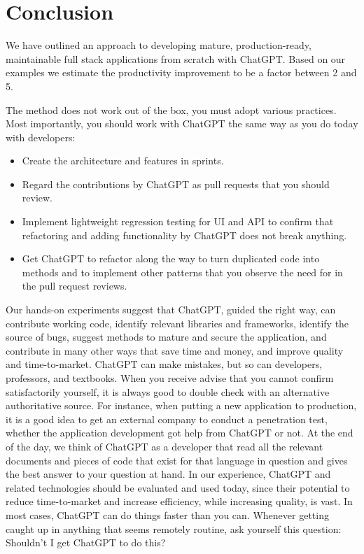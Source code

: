 \documentclass[runningheads]{llncs}
\begin{document}
\section{Conclusion}
We have outlined an approach to developing mature, production-ready, maintainable full stack applications from scratch with ChatGPT. Based on our examples we estimate the productivity improvement to be a factor between 2 and 5.

The method does not work out of the box, you must adopt various practices. Most importantly, you should work with ChatGPT the same way as you do today with developers:
\begin{itemize}
    \item Create the architecture and features in sprints.
    \item Regard the contributions by ChatGPT as pull requests that you should review.
    \item Implement lightweight regression testing for UI and API to confirm that refactoring and adding functionality by ChatGPT does not break anything.
    \item Get ChatGPT to refactor along the way to turn duplicated code into methods and to implement other patterns that you observe the need for in the pull request reviews.
\end{itemize}
Our hands-on experiments suggest that ChatGPT, guided the right way, can contribute working code, identify relevant libraries and frameworks, identify the source of bugs, suggest methods to mature and secure the application, and contribute in many other ways that save time and money, and improve quality and time-to-market.
ChatGPT can make mistakes, but so can developers, professors, and textbooks. When you receive advise that you cannot confirm satisfactorily yourself, it is always good to double check with an alternative authoritative source. For instance, when putting a new application to production, it is a good idea to get an external company to conduct a penetration test, whether the application development got help from ChatGPT or not.
At the end of the day, we think of ChatGPT as a developer that read all the relevant documents and pieces of code that exist for that language in question and gives the best answer to your question at hand. In our experience, ChatGPT and related technologies should be evaluated and used today, since their potential to reduce time-to-market and increase efficiency, while increasing quality, is vast.
In most cases, ChatGPT can do things faster than you can. Whenever getting caught up in anything that seems remotely routine, ask yourself this question: Shouldn't I get ChatGPT to do this?
\end{document}
